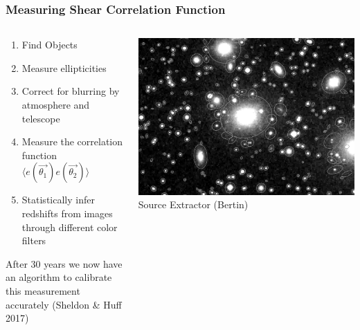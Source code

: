 \documentclass{beamer}
\begin{document}
{\begin{columns}
    \end{columns}


}

\frame
{

    \frametitle{Measuring Shear Correlation Function}


    \begin{columns}
        \begin{column}{0.5\textwidth}
            \begin{enumerate}

                \item Find Objects

                \item Measure ellipticities

                \item Correct for blurring by atmosphere and telescope

                \item Measure the correlation function
                    {\color{gold} $\langle e(\vec{\theta_1}) e(\vec{\theta_2}) \rangle$ }
                \item Statistically infer redshifts from
                    images through different color filters


            \end{enumerate}

            After 30 years we now have an algorithm to calibrate
                this measurement accurately (Sheldon \& Huff 2017)

        \end{column}
        \begin{column}{0.5\textwidth}

            \begin{center}
                \includegraphics[width=\textwidth]{sun226_fig.png}
                \newline
                {\tiny Source Extractor (Bertin)}
            \end{center}

        \end{column}

    \end{columns}


}
\end{document}
